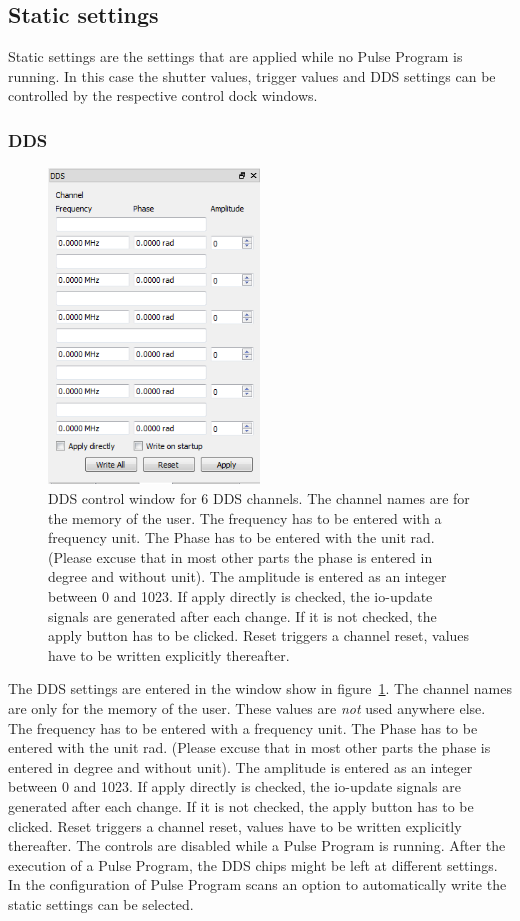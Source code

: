 \documentclass[11pt]{scrartcl}
\begin{document}
\subsection{Static settings}
Static settings are the settings that are applied while no Pulse Program is running. In this case the shutter values, trigger values and DDS settings can be controlled by the respective control dock windows.

\subsubsection{DDS}
\begin{figure}
\centering
\includegraphics[width=0.5\textwidth]{DDS}
\caption{\label{DDS} DDS control window for 6 DDS channels. The channel names are for the memory of the user. The frequency has to be entered with a frequency unit. The Phase has to be entered with the unit rad. (Please excuse that in most other parts the phase is entered in degree and without unit). The amplitude is entered as an integer between 0 and 1023. If apply directly is checked, the io-update signals are generated after each change. If it is not checked, the apply button has to be clicked. Reset triggers a channel reset, values have to be written explicitly thereafter. }
\end{figure}
The DDS settings are entered in the window show in figure~\ref{DDS}.  The channel names are only for the memory of the user. These values are {\em not} used anywhere else. The frequency has to be entered with a frequency unit. The Phase has to be entered with the unit rad. (Please excuse that in most other parts the phase is entered in degree and without unit). The amplitude is entered as an integer between 0 and 1023. If apply directly is checked, the io-update signals are generated after each change. If it is not checked, the apply button has to be clicked. Reset triggers a channel reset, values have to be written explicitly thereafter. The controls are disabled while a Pulse Program is running. After the execution of a Pulse Program, the DDS chips might be left at different settings. In the configuration of Pulse Program scans an option to automatically write the static settings can be selected.
\end{document}
